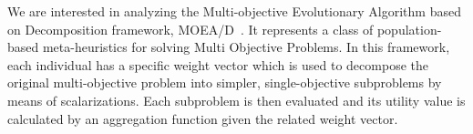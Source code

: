 

We are interested in analyzing the Multi-objective Evolutionary Algorithm based on Decomposition framework, MOEA/D~\cite{zhang2007moea}. It represents a class of population-based meta-heuristics for solving Multi Objective Problems. In
this framework, each individual has a specific weight vector which is used to decompose the original multi-objective problem into simpler, single-objective subproblems by means of scalarizations. Each subproblem is then evaluated and its utility value is calculated by an aggregation function given the related weight vector. 

